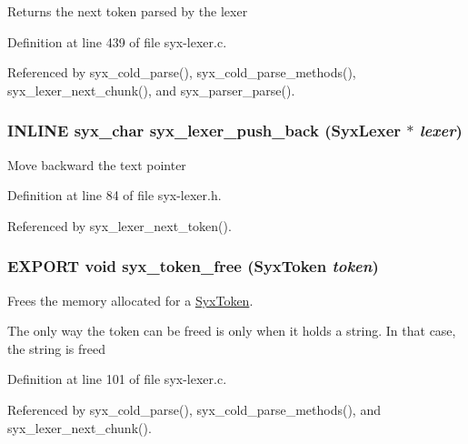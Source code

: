 Returns the next token parsed by the lexer 

Definition at line 439 of file syx-lexer.c.

Referenced by syx\_\-cold\_\-parse(), syx\_\-cold\_\-parse\_\-methods(), syx\_\-lexer\_\-next\_\-chunk(), and syx\_\-parser\_\-parse().\hypertarget{syx-lexer_8h_c2161d821b8fa1df61846b0864e216ae}{
\subsubsection{\setlength{\rightskip}{0pt plus 5cm}INLINE {\bf syx\_\-char} syx\_\-lexer\_\-push\_\-back ({\bf SyxLexer} $\ast$ {\em lexer})}}
\label{syx-lexer_8h_c2161d821b8fa1df61846b0864e216ae}


Move backward the text pointer 

Definition at line 84 of file syx-lexer.h.

Referenced by syx\_\-lexer\_\-next\_\-token().\hypertarget{syx-lexer_8h_61906561dfa01694449abc504d9b913a}{
\subsubsection{\setlength{\rightskip}{0pt plus 5cm}EXPORT void syx\_\-token\_\-free ({\bf SyxToken} {\em token})}}
\label{syx-lexer_8h_61906561dfa01694449abc504d9b913a}


Frees the memory allocated for a \hyperlink{struct_syx_token}{SyxToken}.

The only way the token can be freed is only when it holds a string. In that case, the string is freed 

Definition at line 101 of file syx-lexer.c.

Referenced by syx\_\-cold\_\-parse(), syx\_\-cold\_\-parse\_\-methods(), and syx\_\-lexer\_\-next\_\-chunk().